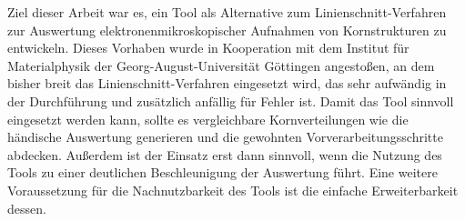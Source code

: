 \documentclass[
  12pt,
  openany]{book}
\begin{document}
Ziel dieser Arbeit war es, ein Tool als Alternative zum Linienschnitt-Verfahren zur Auswertung elektronenmikroskopischer Aufnahmen von Kornstrukturen zu entwickeln. Dieses Vorhaben wurde in Kooperation mit dem Institut für Materialphysik der Georg-August-Universität Göttingen angestoßen, an dem bisher breit das Linienschnitt-Verfahren eingesetzt wird, das sehr aufwändig in der Durchführung und zusätzlich anfällig für Fehler ist.
Damit das Tool sinnvoll eingesetzt werden kann, sollte es vergleichbare Kornverteilungen wie die händische Auswertung generieren und die gewohnten Vorverarbeitungsschritte abdecken. Außerdem ist der Einsatz erst dann sinnvoll, wenn die Nutzung des Tools zu einer deutlichen Beschleunigung der Auswertung führt. Eine weitere Voraussetzung für die Nachnutzbarkeit des Tools ist die einfache Erweiterbarkeit dessen.
\end{document}
